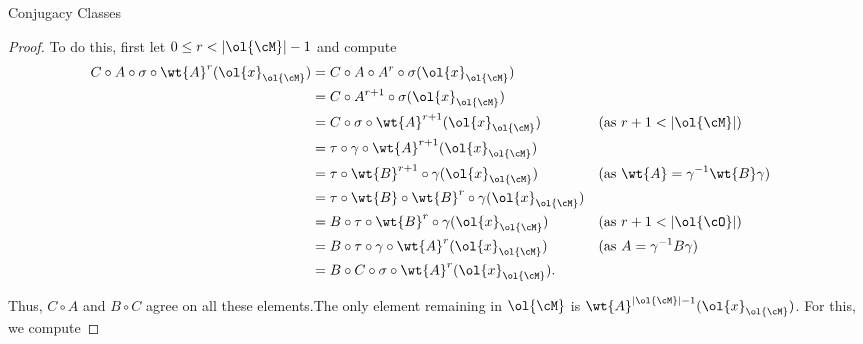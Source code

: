 \documentclass[12nt]{article}
\theoremstyle{plain}
\begin{document}
\begin{subsection}{Conjugacy Classes}
\begin{proof}
To do this, first let $0 \leq r < |\ol{\cM}| - 1$ and compute 
\begin{align*}
	C \circ A \circ \sigma \circ \wt{A}^r(\ol{x}_{\ol{\cM}}) &= C \circ A \circ A^r \circ \sigma(\ol{x}_{\ol{\cM}}) \\
		&= C \circ A^{r + 1} \circ \sigma (\ol{x}_{\ol{\cM}}) \\
		&= C \circ \sigma \circ \wt{A}^{r + 1}(\ol{x}_{\ol{\cM}}) && \text{(as $r + 1 < |\ol{\cM}|$)} \\
		&= \tau \circ \gamma \circ \wt{A}^{r + 1}(\ol{x}_{\ol{\cM}}) \\
		&= \tau \circ \wt{B}^{r + 1} \circ \gamma(\ol{x}_{\ol{\cM}}) && (\text{as } \wt{A} = \gamma^{-1}\wt{B}\gamma) \\
		&=\tau \circ \wt{B} \circ \wt{B}^r \circ \gamma(\ol{x}_{\ol{\cM}}) \\
		&= B \circ \tau \circ \wt{B}^r \circ \gamma(\ol{x}_{\ol{\cM}}) && (\text{as } r + 1 < |\ol{\cO}|)\\
		&= B \circ \tau \circ \gamma \circ \wt{A}^r(\ol{x}_{\ol{\cM}}) && (\text{as } A = \gamma^{-1}B\gamma) \\
		&= B \circ C \circ \sigma \circ \wt{A}^r(\ol{x}_{\ol{\cM}}).
\end{align*}

Thus, $C \circ A$ and $B \circ C$ agree on all these elements.The only element remaining in $\ol{\cM}$ is $\wt{A}^{|\ol{\cM}| - 1}(\ol{x}_{\ol{\cM}})$. For this, we compute


\end{proof}
\end{subsection}
\end{document}
